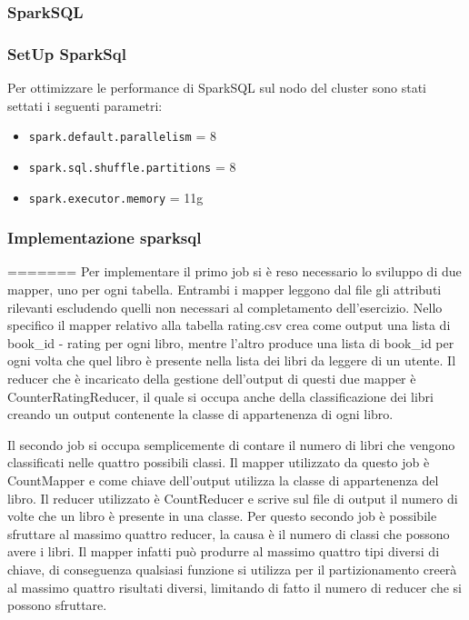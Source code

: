 \subsubsection{SparkSQL}

\subsubsection{SetUp SparkSql}
Per ottimizzare le performance di SparkSQL sul nodo del cluster sono stati settati i seguenti parametri:
\begin{itemize}
    \item \texttt{spark.default.parallelism} = 8
    \item \texttt{spark.sql.shuffle.partitions} = 8
    \item \texttt{spark.executor.memory} = 11g
\end{itemize}

\subsubsection{Implementazione sparksql}
=======
Per implementare il primo job si è reso necessario lo sviluppo di due mapper, uno per ogni tabella.
Entrambi i mapper leggono dal file gli attributi rilevanti escludendo quelli non necessari al completamento dell'esercizio.
Nello specifico il mapper relativo alla tabella rating.csv crea come output una lista di book_id - rating per ogni libro, mentre l'altro
produce una lista di book_id per ogni volta che quel libro è presente nella lista dei libri da leggere di un utente.
Il reducer che è incaricato della gestione dell'output di questi due mapper è CounterRatingReducer, il quale si occupa anche della classificazione dei
libri creando un output contenente la classe di appartenenza di ogni libro.

Il secondo job si occupa semplicemente di contare il numero di libri che vengono classificati nelle quattro possibili classi.
Il mapper utilizzato da questo job è CountMapper e come chiave dell'output utilizza la classe di appartenenza del libro.
Il reducer utilizzato è CountReducer e scrive sul file di output il numero di volte che un libro è presente in una classe.
Per questo secondo job è possibile sfruttare al massimo quattro reducer, la causa è il numero di classi che possono avere i libri.
Il mapper infatti può produrre al massimo quattro tipi diversi di chiave, di conseguenza qualsiasi funzione si utilizza per il partizionamento
creerà al massimo quattro risultati diversi, limitando di fatto il numero di reducer che si possono sfruttare.


